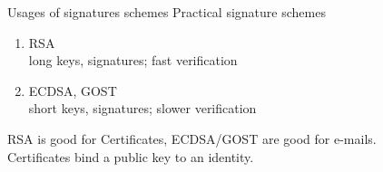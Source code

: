 \documentclass[usenames,dvipsnames, 9pt]{beamer}
\begin{document}
\begin{frame}{Usages of signatures schemes}
	\Large
	Practical signature schemes 
	\begin{enumerate}
		\itemsep 10pt
		\item RSA \\
		long keys, signatures; fast verification
		\item ECDSA, GOST\\
		short keys, signatures; slower verification
	\end{enumerate}
\vspace{10pt}
RSA is good for {\color{Orange} Certificates}, ECDSA/GOST are good for e-mails. \\[10pt]

Certificates  bind a public key to an identity.
\end{frame}
\end{document}
